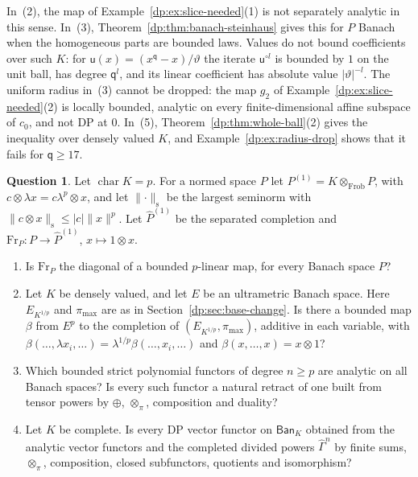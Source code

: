 \documentclass[11pt]{amsart}
\theoremstyle{definition}
\theoremstyle{remark}
\numberwithin{equation}{section}
\newcommand{\abs}[1]{\lvert #1\rvert}
\newcommand{\norm}[1]{\lVert #1\rVert}
\theoremstyle{plain}
\theoremstyle{definition}
\newtheorem{question}[theorem]{Question}
\theoremstyle{plain}
\newcommand{\hGamma}{\widehat\Gamma}
\begin{document}
In~(2), the map of Example~\ref{dp:ex:slice-needed}(1) is not separately analytic in this sense. In~(3), Theorem~\ref{dp:thm:banach-steinhaus} gives this for $P$ Banach when the homogeneous parts are bounded laws. Values do not bound coefficients over such $K$: for $\mathsf u(x)=(x^{\mathsf q}-x)/\vartheta$ the iterate $\mathsf u^{\circ l}$ is bounded by $1$ on the unit ball, has degree $\mathsf q^l$, and its linear coefficient has absolute value $\abs\vartheta^{-l}$. The uniform radius in~(3) cannot be dropped: the map $g_2$ of Example~\ref{dp:ex:slice-needed}(2) is locally bounded, analytic on every finite-dimensional affine subspace of $c_0$, and not DP at $0$. In~(5), Theorem~\ref{dp:thm:whole-ball}(2) gives the inequality over densely valued $K$, and Example~\ref{dp:ex:radius-drop} shows that it fails for $\mathsf q\ge17$.

\begin{question}\label{dp:q:functors}
Let $\operatorname{char}K=p$. For a normed space $P$ let $P^{(1)}=K\otimes_{\mathrm{Frob}}P$, with $c\otimes\lambda x=c\lambda^p\otimes x$, and let $\norm\cdot_{\mathrm s}$ be the largest seminorm with $\norm{c\otimes x}_{\mathrm s}\le\abs c\norm x^p$. Let $\widehat P^{(1)}$ be the separated completion and $\mathrm{Fr}_P\colon P\to\widehat P^{(1)}$, $x\mapsto1\otimes x$.
\begin{enumerate}
\item Is $\mathrm{Fr}_P$ the diagonal of a bounded $p$\nobreakdash-linear map, for every Banach space $P$?
\item Let $K$ be densely valued, and let $E$ be an ultrametric Banach space. Here $E_{K^{1/p}}$ and $\pi_{\max}$ are as in Section~\ref{dp:sec:base-change}. Is there a bounded map $\beta$ from $E^p$ to the completion of $(E_{K^{1/p}},\pi_{\max})$, additive in each variable, with $\beta(\dots,\lambda x_i,\dots)=\lambda^{1/p}\beta(\dots,x_i,\dots)$ and $\beta(x,\dots,x)=x\otimes1$?
\item Which bounded strict polynomial functors of degree $n\ge p$ are analytic on all Banach spaces? Is every such functor a natural retract of one built from tensor powers by $\oplus$, $\otimes_\pi$, composition and duality?
\item Let $K$ be complete. Is every DP vector functor on $\mathsf{Ban}_K$ obtained from the analytic vector functors and the completed divided powers $\hGamma^n$ by finite sums, $\otimes_\pi$, composition, closed subfunctors, quotients and isomorphism?
\end{enumerate}
\end{question}
\end{document}
